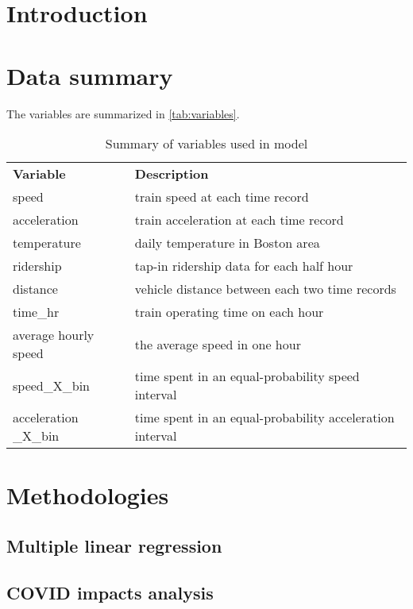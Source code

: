 \documentclass[titlepage,oneside,12pt]{article}
\newcommand{\?}{\stackrel{?}{=}}
\begin{document}
\section{Introduction}



\section{Data summary}

The variables are summarized in \autoref{tab:variables}.
\begin{table}[ht]\footnotesize
    \centering
    \begin{tabular}{l l}\toprule
        \bf Variable & \bf Description \\
       speed  &  train speed at each time record \\
       acceleration  &  train acceleration at each time record \\
       temperature & daily temperature in Boston area\\
       ridership & tap-in ridership data for each half hour\\
       distance & vehicle distance between each two time records\\
       time\_hr & train operating time on each hour\\
       average hourly speed & the average speed in one hour\\
       speed\_X\_bin & time spent in an equal-probability speed interval \\
       acceleration \_X\_bin & time spent in an equal-probability acceleration interval \\
       \bottomrule
    \end{tabular}
    \caption{Summary of variables used in model}
    \label{tab:variables}
\end{table}




\section{Methodologies}


\subsection{Multiple linear regression}



\subsection{COVID impacts analysis}
\end{document}
